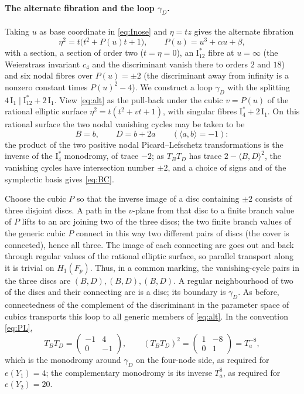\documentclass[12pt]{article}
\newcommand{\I}{\mathrm{I}}
\theoremstyle{definition}
\theoremstyle{remark}
\begin{document}
\paragraph{The alternate fibration and the loop \(\gamma_D\).}
Taking \(u\) as base coordinate in \eqref{eq:Inose} and \(\eta=tz\)
gives the alternate fibration
\begin{equation}\label{eq:alt}
 \eta^2=t\bigl(t^2+P(u)t+1\bigr),\qquad P(u)=u^3+\alpha u+\beta ,
\end{equation}
with a section, a section of order two (\(t=\eta=0\)), an
\(\I_{12}^*\) fibre at \(u=\infty\) (the Weierstrass invariant \(c_4\)
and the discriminant vanish there to orders \(2\) and \(18\)) and six nodal fibres over
\(P(u)=\pm2\) (the discriminant away from infinity is a nonzero
constant times \(P(u)^2-4\)). We construct a loop \(\gamma_D\) with
the splitting \(4\,\I_1\mid\I_{12}^*+2\,\I_1\). View \eqref{eq:alt} as the pull-back under the cubic \(v=P(u)\) of the
rational elliptic surface \(\eta^2=t(t^2+vt+1)\), with singular fibres
\(\I_4^*+2\,\I_1\). On this rational surface the two nodal vanishing
cycles may be taken to be
\begin{equation}\label{eq:BC}
 B=b,\qquad D=b+2a\qquad(\langle a,b\rangle=-1):
\end{equation}
the product of the two positive nodal Picard--Lefschetz
transformations is the inverse of the \(\I_4^*\) monodromy, of trace
\(-2\); as \(T_BT_D\) has trace \(2-\langle B,D\rangle^2\), the
vanishing cycles have intersection number \(\pm2\), and a choice of
signs and of the symplectic basis gives \eqref{eq:BC}.

Choose the cubic \(P\) so that the inverse image of a disc containing
\(\pm2\) consists of three disjoint discs. A path in the \(v\)-plane
from that disc to a finite branch value of \(P\) lifts to an arc
joining two of the three discs; the two finite branch values of the
generic cubic \(P\) connect in this way two different pairs of discs
(the cover is connected), hence all three. The image of each
connecting arc goes out and back through regular values of the
rational elliptic surface, so parallel transport along it is trivial
on \(H_1(F_p)\). Thus, in a common marking, the vanishing-cycle pairs
in the three discs are \((B,D),(B,D),(B,D)\). A regular
neighbourhood of two of the discs and their connecting arc is a disc;
its boundary is \(\gamma_D\). As before, connectedness of the
complement of the discriminant in the parameter space of cubics
transports this loop to all generic members of \eqref{eq:alt}. In the
convention \eqref{eq:PL},
\begin{equation}\label{eq:monodromy}
 T_BT_D=\left(\begin{smallmatrix}-1&4\\0&-1\end{smallmatrix}\right),
 \qquad
 (T_BT_D)^2=\left(\begin{smallmatrix}1&-8\\0&1\end{smallmatrix}\right)=T_a^{-8},
\end{equation}
which is the monodromy around \(\gamma_D\) on the four-node side, as
required for \(e(Y_1)=4\); the complementary monodromy is its inverse
\(T_a^{8}\), as required for \(e(Y_2)=20\).
\end{document}
